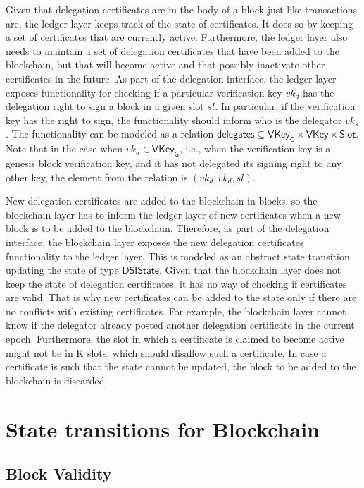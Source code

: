 \documentclass[11pt,a4paper]{article}
\newcommand{\fun}[1]{\mathsf{#1}}
\newcommand{\type}[1]{\mathsf{#1}}
\newcommand{\Slot}{\type{Slot}}
\newcommand{\VKey}{\type{VKey}}
\newcommand{\VKeyGen}{\type{VKey_G}}
\newcommand{\DelegState}{\type{DSIState}}
\newcommand{\delegationname}{delegates} %
\begin{document}
Given that delegation certificates are in the body of a block just like
transactions are, the ledger layer keeps track of the state of certificates.
%
It does so by keeping a set of certificates that are currently active.
%
Furthermore, the ledger layer also needs to maintain a set of delegation
certificates that have been added to the blockchain, but that will become
active and that possibly inactivate other certificates in the future.
%
As part of the delegation interface, the ledger layer exposes functionality
for checking if a particular verification key $vk_d$ has the delegation right
to sign a block in a given slot $sl$.
%
In particular, if the verification key has the right to sign, the
functionality should inform who is the delegator $vk_s$.
%
The functionality can be modeled as a relation
$\fun{\delegationname} \subseteq \VKeyGen \times \VKey \times \Slot$.
%
Note that in the case when $vk_d \in \VKeyGen$, i.e., when the verification
key is a genesis block verification key, and it has not delegated its signing
right to any other key, the element from the relation is $(vk_d, vk_d, sl)$.


New delegation certificates are added to the blockchain in blocks, so the
blockchain layer has to inform the ledger layer of new certificates when a new
block is to be added to the blockchain.
%
Therefore, as part of the delegation interface, the blockchain layer exposes
the new delegation certificates functionality to the ledger layer.
%
This is modeled as an abstract state transition updating the state of type
$\DelegState$.
%
Given that the blockchain layer does not keep the state of delegation
certificates, it has no way of checking if certificates are valid.
%
That is why new certificates can be added to the state only if there are no
conflicts with existing certificates.
%
For example, the blockchain layer cannot know if the delegator already posted
another delegation certificate in the current epoch.
%
Furthermore, the slot in which a certificate is claimed to become active might
not be in K slots, which should disallow such a certificate.
%
In case a certificate is such that the state cannot be updated, the block to
be added to the blockchain is discarded.


\section{State transitions for Blockchain}
\label{sec:state-trans-chain}

\subsection{Block Validity}
\label{sec:block-valid}
\end{document}
